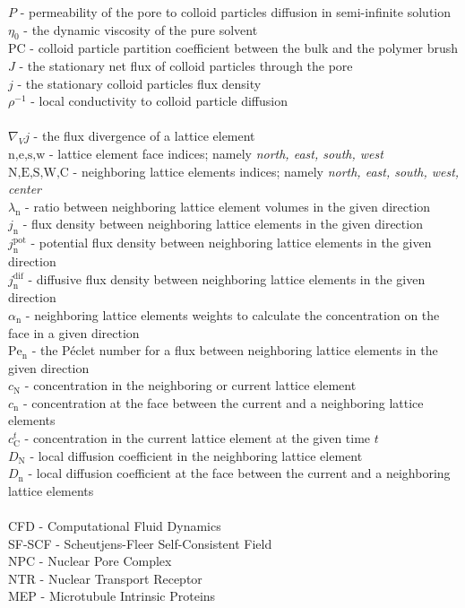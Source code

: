 \documentclass[12pt, a4paper]{article}
\begin{document}
$P$ - permeability of the pore to colloid particles diffusion in semi-infinite solution \\
$\eta_{0}$ - the dynamic viscosity of the pure solvent \\
$\textrm{PC}$ - colloid particle partition coefficient between the bulk and the polymer brush \\
$J$ - the stationary net flux of colloid particles through the pore \\
$j$ - the stationary colloid particles flux density \\
$\rho^{-1}$ - local conductivity to colloid particle diffusion \\
\\
$\nabla_{V} j$ - the flux divergence of a lattice element \\
$\textrm{n,e,s,w}$ - lattice element face indices; namely \textit{north, east, south, west} \\
$\textrm{N,E,S,W,C}$ - neighboring lattice elements indices; namely \textit{north, east, south, west, center} \\
$\lambda_{\textrm{n}}$ - ratio between neighboring lattice element volumes in the given direction \\
$j_{\textrm{n}}$ - flux density between neighboring lattice elements in the given direction \\
$j^{\textrm{pot}}_{\textrm{n}}$ - potential flux density between neighboring lattice elements in the given direction \\
$j^{\textrm{dif}}_{\textrm{n}}$ - diffusive flux density between neighboring lattice elements in the given direction \\
$\alpha_{\textrm{n}}$ - neighboring lattice elements weights to calculate the concentration on the face in a given direction \\
$\textrm{Pe}_{\textrm{n}}$ - the Péclet number for a flux between neighboring lattice elements in the given direction \\
$c_{\textrm{N}}$ - concentration in the neighboring or current lattice element \\
$c_{\textrm{n}}$ - concentration at the face between the current and a neighboring lattice elements \\ 
$c^{t}_{\textrm{C}}$ - concentration in the current lattice element at the given time $t$ \\ 
$D_{\textrm{N}}$ - local diffusion coefficient in the neighboring lattice element \\
$D_{\textrm{n}}$ - local diffusion coefficient at the face between the current and a neighboring lattice elements \\
\\
CFD - Computational Fluid Dynamics \\
SF-SCF - Scheutjens-Fleer Self-Consistent Field \\
NPC - Nuclear Pore Complex \\
NTR - Nuclear Transport Receptor \\
MEP - Microtubule Intrinsic Proteins \\
\end{document}
